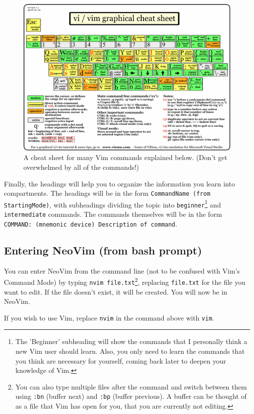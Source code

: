 \documentclass[11pt]{article}
\begin{document}
\begin{figure}[htbp]
\centering
\includegraphics[width=.9\linewidth]{./vi-vim-cheat-sheet.png}
\caption{\label{fig:org35d7b56}
A cheat sheet for many Vim commands explained below. (Don't get overwhelmed by all of the commands!)}
\end{figure}

Finally, the headings will help you to organize the information you learn into
compartments. The headings will be in the form \texttt{CommandName (from StartingMode)},
with subheadings dividing the topic into \texttt{beginner}\footnote{The 'Beginner' subheading will show the commands that I personally
think a new Vim user should learn. Also, you only need to learn the commands
that you think are necessary for yourself, coming back later to deepen your
knowledge of Vim.} and \texttt{intermediate} commands.
The commands themselves will be in the form \texttt{COMMAND: (mnemonic device)
Description of command}.
\subsection{Entering NeoVim (from bash prompt)}
\label{sec:org3a1f2af}
You can enter NeoVim from the command line (not to be confused with Vim's
Command Mode) by typing \texttt{nvim file.txt}\footnote{You can also type multiple files after the command and switch
between them using \texttt{:bn} (buffer next) and \texttt{:bp} (buffer previous). A buffer can
be thought of as a file that Vim has open for you, that you are currently not
editing.}, replacing \texttt{file.txt} for the file you
want to edit. If the file doesn't exist, it will be created. You will now be in
NeoVim.

If you wish to use Vim, replace \texttt{nvim} in the command above with \texttt{vim}.
\end{document}
